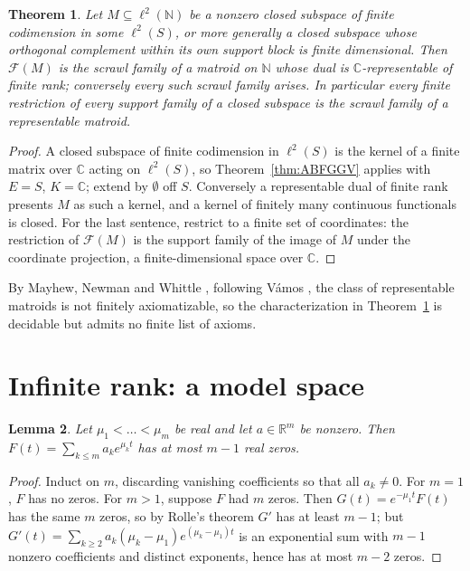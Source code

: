 \documentclass[11pt,reqno]{amsart}
\newtheorem{theorem}{Theorem}[section]
\newtheorem{lemma}[theorem]{Lemma}
\theoremstyle{definition}
\newcommand{\N}{\mathbb{N}}
\newcommand{\C}{\mathbb{C}}
\newcommand{\R}{\mathbb{R}}
\newcommand{\F}{\mathcal{F}}
\begin{document}
\begin{theorem}\label{thm:finiterank}
Let $M\subseteq\ell^2(\N)$ be a nonzero closed subspace of finite codimension
in some $\ell^2(S)$, or more generally a closed subspace whose orthogonal
complement within its own support block is finite dimensional. Then $\F(M)$ is
the scrawl family of a matroid on $\N$ whose dual is $\C$-representable of
finite rank; conversely every such scrawl family arises. In particular every
finite restriction of every support family of a closed subspace is the scrawl
family of a representable matroid.
\end{theorem}

\begin{proof}
A closed subspace of finite codimension in $\ell^2(S)$ is the kernel of a
finite matrix over $\C$ acting on $\ell^2(S)$, so Theorem~\ref{thm:ABFGGV}
applies with $E=S$, $K=\C$; extend by $\emptyset$ off $S$. Conversely a
representable dual of finite rank presents $M$ as such a kernel, and a kernel
of finitely many continuous functionals is closed. For the last sentence,
restrict to a finite set of coordinates: the restriction of $\F(M)$ is the
support family of the image of $M$ under the coordinate projection, a
finite-dimensional space over $\C$.
\end{proof}

By Mayhew, Newman and Whittle \cite{MNW14}, following V\'amos \cite{V78}, the
class of representable matroids is not finitely axiomatizable, so the
characterization in Theorem~\ref{thm:finiterank} is decidable
\cite{S87} but admits no finite list of axioms.

\section{Infinite rank: a model space}\label{sec:infinite}

\begin{lemma}\label{lem:expzeros}
Let $\mu_1<\dots<\mu_m$ be real and let $a\in\R^m$ be nonzero. Then
$F(t)=\sum_{k\le m}a_ke^{\mu_kt}$ has at most $m-1$ real zeros.
\end{lemma}

\begin{proof}
Induct on $m$, discarding vanishing coefficients so that all $a_k\neq0$. For
$m=1$, $F$ has no zeros. For $m>1$, suppose $F$ had $m$ zeros. Then
$G(t)=e^{-\mu_1t}F(t)$ has the same $m$ zeros, so by Rolle's theorem $G'$ has
at least $m-1$; but
$G'(t)=\sum_{k\ge2}a_k(\mu_k-\mu_1)e^{(\mu_k-\mu_1)t}$ is an exponential sum
with $m-1$ nonzero coefficients and distinct exponents, hence has at most
$m-2$ zeros.
\end{proof}
\end{document}
